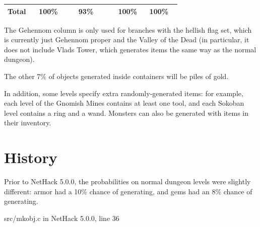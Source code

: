 \begin{longtable}{|>{\RaggedRight}p{0.15554\linewidth}|>{\RaggedRight}p{0.19251\linewidth}|>{\RaggedRight}p{0.19844\linewidth}|>{\RaggedRight}p{0.15446\linewidth}|>{\RaggedRight}p{0.15619\linewidth}|}
\hspace*{0pt}\ignorespaces{}\hspace*{0pt}Total&\hspace*{0pt}\ignorespaces{}\hspace*{0pt}100\%&\hspace*{0pt}\ignorespaces{}\hspace*{0pt}93\%&\hspace*{0pt}\ignorespaces{}\hspace*{0pt}100\%&\hspace*{0pt}\ignorespaces{}\hspace*{0pt}100\%\\ \hline 
\end{longtable}
The Gehennom column is only used for branches with the hellish flag set, which is currently just Gehennom proper and the Valley of the Dead\footnotemark[45] (in particular, it does not include Vlad\textquotesingle{}s Tower\footnotemark[46], which generates items the same way as the normal dungeon).

The other 7\% of objects generated inside containers will be piles of gold.

In addition, some levels specify extra randomly-{}generated items: for example, each level of the Gnomish Mines\footnotemark[47] contains at least one tool, and each Sokoban\footnotemark[48] level contains a ring and a wand. Monsters\footnotemark[49] can also be generated with items in their inventory\footnotemark[50].

\section{History}
\label{3}
Prior to NetHack 5.0.0\footnotemark[51], the probabilities on normal dungeon levels were slightly different: armor had a 10\% chance of generating, and gems had an 8\% chance of generating.

\begin{myenumerate}
\item{} src/mkobj.c in NetHack 5.0.0, line 36\footnotemark[52]
\end{myenumerate}
